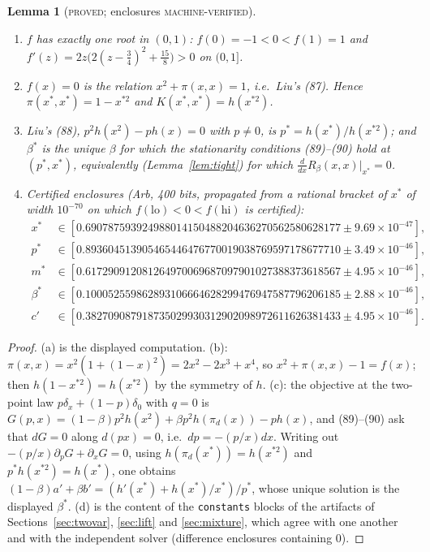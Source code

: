\documentclass[11pt]{article}
\theoremstyle{plain}
\newtheorem{lemma}[theorem]{Lemma}
\theoremstyle{definition}
\theoremstyle{remark}
\newcommand{\lbl}[1]{\textsc{#1}}
\begin{document}
\begin{lemma}[\lbl{proved}; enclosures \lbl{machine-verified}]\label{lem:constants}
\leavevmode
\begin{enumerate}[label=(\alph*),nosep]
\item $f$ has exactly one root in $(0,1)$: $f(0)=-1<0<f(1)=1$ and
$f'(z)=2z\bigl(2(z-\tfrac34)^2+\tfrac{15}8\bigr)>0$ on $(0,1]$.
\item $f(x)=0$ is the relation $x^2+\pi(x,x)=1$, i.e.\ Liu's (87).  Hence
$\pi(x^\ast,x^\ast)=1-x^{\ast2}$ and $K(x^\ast,x^\ast)=h(x^{\ast2})$.
\item Liu's (88), $p^2h(x^2)-ph(x)=0$ with $p\neq0$, is $p^\ast=h(x^\ast)/h(x^{\ast2})$;
and $\beta^\ast$ is the unique $\beta$ for which the stationarity conditions
(89)--(90) hold at $(p^\ast,x^\ast)$, equivalently (Lemma~\ref{lem:tight}) for
which $\frac{d}{dx}R_\beta(x,x)\big|_{x^\ast}=0$.
\item Certified enclosures (Arb, 400 bits, propagated from a rational bracket
of $x^\ast$ of width $10^{-70}$ on which $f(\mathrm{lo})<0<f(\mathrm{hi})$
is certified):
\begin{align*}
x^\ast&\in[0.690787593924988014150488204636270562580628177\pm9.69\times10^{-47}],\\
p^\ast&\in[0.893604513905465446476770019038769597178677710\pm3.49\times10^{-46}],\\
m^\ast&\in[0.617290912081264970069687097901027388373618567\pm4.95\times10^{-46}],\\
\beta^\ast&\in[0.100052559862893106664628299476947587796206185\pm2.88\times10^{-46}],\\
c'&\in[0.382709087918735029930312902098972611626381433\pm4.95\times10^{-46}].
\end{align*}
\end{enumerate}
\end{lemma}
\begin{proof}
(a) is the displayed computation.  (b): $\pi(x,x)=x^2(1+(1-x)^2)=2x^2-2x^3+x^4$,
so $x^2+\pi(x,x)-1=f(x)$; then $h(1-x^{\ast2})=h(x^{\ast2})$ by the symmetry
of $h$.  (c): the objective at the two-point law $p\delta_x+(1-p)\delta_0$
with $q=0$ is $G(p,x)=(1-\beta)p^2h(x^2)+\beta p^2h(\pi_d(x))-ph(x)$, and
(89)--(90) ask that $dG=0$ along $d(px)=0$, i.e.\ $dp=-(p/x)dx$.  Writing
out $-(p/x)\partial_pG+\partial_xG=0$, using $h(\pi_d(x^\ast))=h(x^{\ast2})$
and $p^\ast h(x^{\ast2})=h(x^\ast)$, one obtains
$(1-\beta)a'+\beta b'=(h'(x^\ast)+h(x^\ast)/x^\ast)/p^\ast$, whose unique
solution is the displayed $\beta^\ast$.  (d) is the content of the
\texttt{constants} blocks of the artifacts of Sections~\ref{sec:twovar},
\ref{sec:lift} and \ref{sec:mixture}, which agree with one another and with
the independent solver  (difference enclosures
containing $0$).
\end{proof}
\end{document}

